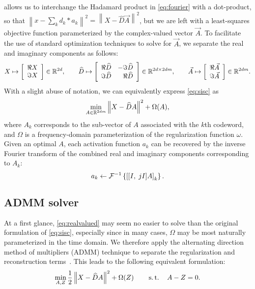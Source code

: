 \documentclass{article} %
\begin{document}
 allows us to interchange the Hadamard product in
\eqref{eq:fourier} with a dot-product, so that 
$\left\|x - \sum_k d_k * a_k\right\|^2 =  \left\|X - \widehat{D}\vec{A}\right\|^2$,
but we are left with a least-squares objective function parameterized by the complex-valued 
vector $\vec{A}$. To facilitate the use of standard optimization techniques to solve for
$\vec{A}$, we separate the real and imaginary components as follows:
\begin{equation}
X \mapsto \left[\begin{array}{r}\Re X \\ \Im X\end{array}\right] \in \mathbb{R}^{2d},
\quad\quad \widehat{D} \mapsto \left[\begin{array}{rr}\Re \widehat{D} & - \Im \widehat{D}\\
\Im \widehat{D} & \Re \widehat{D}\end{array}\right] \in \mathbb{R}^{2d\times 2dm},
\quad\quad \vec{A} \mapsto \left[\begin{array}{r}\Re \vec{A} \\ \Im \vec{A}\end{array}\right]
\in \mathbb{R}^{2dm}.\label{eq:realized}
\end{equation}
With a slight abuse of notation, we can equivalently express \eqref{eq:sisc} as
\begin{equation}
\min_{A \in \mathbb{R}^{2dm}} \left\|X - \widehat{D}A\right\|^2 + \Omega(A),\label{eq:realvalued}
\end{equation}
where $A_k$ corresponds to the sub-vector of $A$ associated with the $k$th codeword, and 
$\Omega$ is a frequency-domain parameterization of the regularization function $\omega$.
Given an optimal $A$, each activation function $a_k$ can be 
recovered by the inverse Fourier transform of the combined real and imaginary components
corresponding to $A_k$:
\begin{equation}
a_k \leftarrow \mathcal{F}^{-1} \left\{ {\left[[I,\; jI]A \right]}_k
\right\}.\label{eq:complexify}
\end{equation}

\subsection{ADMM solver}
\label{sec:solver}
At a first glance, \eqref{eq:realvalued} may seem no easier to solve than the original
formulation of \eqref{eq:sisc}, especially since in many cases, $\Omega$ may be most
naturally parameterized in the time domain.  We therefore apply the alternating
direction method of multipliers (ADMM) technique to separate the regularization and
reconstruction terms~\cite{boyd2011}.  This leads to the following equivalent
formulation:
\begin{equation}
\min_{A, Z} \frac{1}{2}\left\|X - \widehat{D}A\right\|^2 + \Omega(Z)
\quad\quad \operatorname{s.t.}\quad A - Z = 0.\label{eq:admm}
\end{equation}
\end{document}
